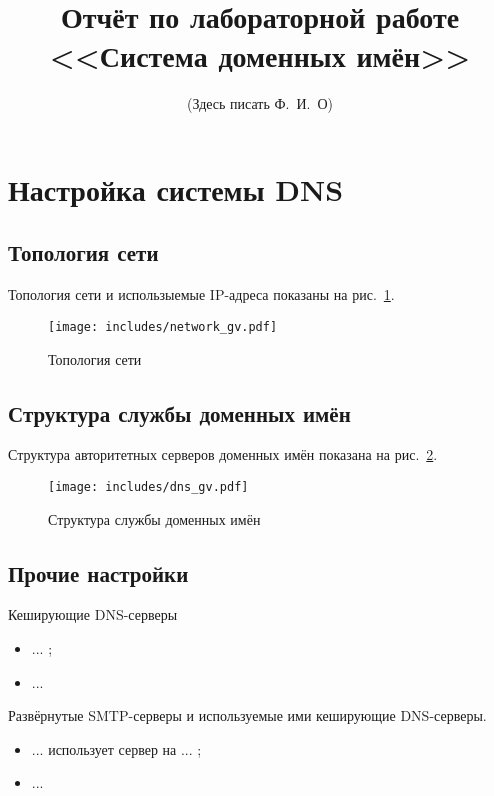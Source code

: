 \documentclass[a4paper,12pt]{article}
\title{Отчёт по лабораторной работе \\ <<Система доменных имён>>}
\author{(Здесь писать Ф.~И.~О)}
\begin{document}
\maketitle

\tableofcontents

\section{Настройка системы DNS}

\subsection{Топология сети}

Топология сети и использыемые IP-адреса показаны на рис.~\ref{fig:network}.

\begin{figure}
\centering
\texttt{[image: includes/network\_gv.pdf]}
\caption{Топология сети}
\label{fig:network}
\end{figure}

\subsection{Структура службы доменных имён}

Структура авторитетных серверов доменных имён показана на рис.~\ref{fig:dns}.

\begin{figure}
\centering
\texttt{[image: includes/dns\_gv.pdf]}
\caption{Структура службы доменных имён}
\label{fig:dns}
\end{figure}

\subsection{Прочие настройки}

Кеширующие DNS-серверы
\begin{itemize}
\item ... ;
\item ...
\end{itemize}

Развёрнутые SMTP-серверы и используемые ими кеширующие DNS-серверы.
\begin{itemize}
\item ... использует сервер на ... ;
\item ...
\end{itemize}
\end{document}
